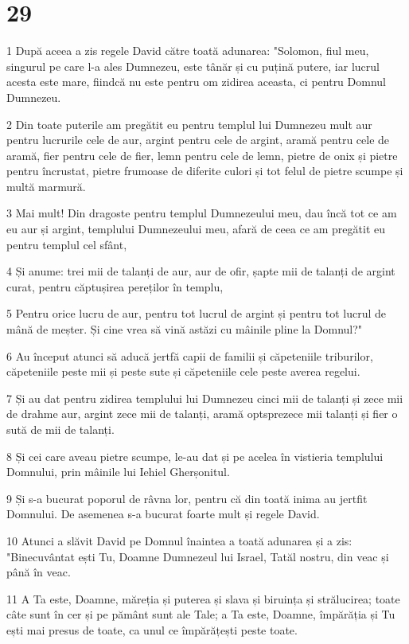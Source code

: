\chapter{29}

\par 1 După aceea a zis regele David către toată adunarea: "Solomon, fiul meu, singurul pe care l-a ales Dumnezeu, este tânăr și cu puțină putere, iar lucrul acesta este mare, fiindcă nu este pentru om zidirea aceasta, ci pentru Domnul Dumnezeu.
\par 2 Din toate puterile am pregătit eu pentru templul lui Dumnezeu mult aur pentru lucrurile cele de aur, argint pentru cele de argint, aramă pentru cele de aramă, fier pentru cele de fier, lemn pentru cele de lemn, pietre de onix și pietre pentru încrustat, pietre frumoase de diferite culori și tot felul de pietre scumpe și multă marmură.
\par 3 Mai mult! Din dragoste pentru templul Dumnezeului meu, dau încă tot ce am eu aur și argint, templului Dumnezeului meu, afară de ceea ce am pregătit eu pentru templul cel sfânt,
\par 4 Și anume: trei mii de talanți de aur, aur de ofir, șapte mii de talanți de argint curat, pentru căptușirea pereților în templu,
\par 5 Pentru orice lucru de aur, pentru tot lucrul de argint și pentru tot lucrul de mână de meșter. Și cine vrea să vină astăzi cu mâinile pline la Domnul?"
\par 6 Au început atunci să aducă jertfă capii de familii și căpeteniile triburilor, căpeteniile peste mii și peste sute și căpeteniile cele peste averea regelui.
\par 7 Și au dat pentru zidirea templului lui Dumnezeu cinci mii de talanți și zece mii de drahme aur, argint zece mii de talanți, aramă optsprezece mii talanți și fier o sută de mii de talanți.
\par 8 Și cei care aveau pietre scumpe, le-au dat și pe acelea în vistieria templului Domnului, prin mâinile lui Iehiel Gherșonitul.
\par 9 Și s-a bucurat poporul de râvna lor, pentru că din toată inima au jertfit Domnului. De asemenea s-a bucurat foarte mult și regele David.
\par 10 Atunci a slăvit David pe Domnul înaintea a toată adunarea și a zis: "Binecuvântat ești Tu, Doamne Dumnezeul lui Israel, Tatăl nostru, din veac și până în veac.
\par 11 A Ta este, Doamne, măreția și puterea și slava și biruința și strălucirea; toate câte sunt în cer și pe pământ sunt ale Tale; a Ta este, Doamne, împărăția și Tu ești mai presus de toate, ca unul ce împărățești peste toate.
